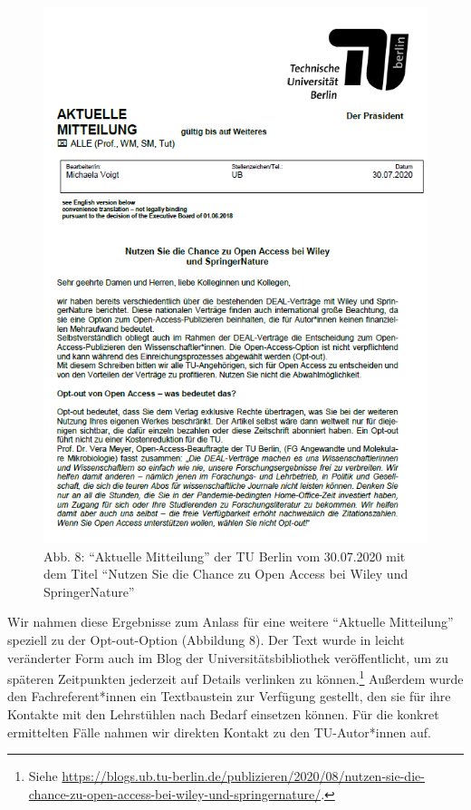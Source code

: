 \documentclass[a4paper,
fontsize=11pt,
oneside,
numbers=noperiodatend,
parskip=half-,
bibliography=totoc,
final
]{scrartcl}
\begin{document}
\begin{figure}
\centering
\includegraphics{img/tubAMoptout.png}
\caption{Abb. 8: \enquote{Aktuelle Mitteilung} der TU Berlin vom
30.07.2020 mit dem Titel \enquote{Nutzen Sie die Chance zu Open Access
bei Wiley und SpringerNature}}
\end{figure}

Wir nahmen diese Ergebnisse zum Anlass für eine weitere
\enquote{Aktuelle Mitteilung} speziell zu der Opt-out-Option (Abbildung
8). Der Text wurde in leicht veränderter Form auch im Blog der
Universitätsbibliothek veröffentlicht, um zu späteren Zeitpunkten
jederzeit auf Details verlinken zu können.\footnote{Siehe
  \url{https://blogs.ub.tu-berlin.de/publizieren/2020/08/nutzen-sie-die-chance-zu-open-access-bei-wiley-und-springernature/}.}
Außerdem wurde den Fachreferent*innen ein Textbaustein zur Verfügung
gestellt, den sie für ihre Kontakte mit den Lehrstühlen nach Bedarf
einsetzen können. Für die konkret ermittelten Fälle nahmen wir direkten
Kontakt zu den TU-Autor*innen auf.
\end{document}

